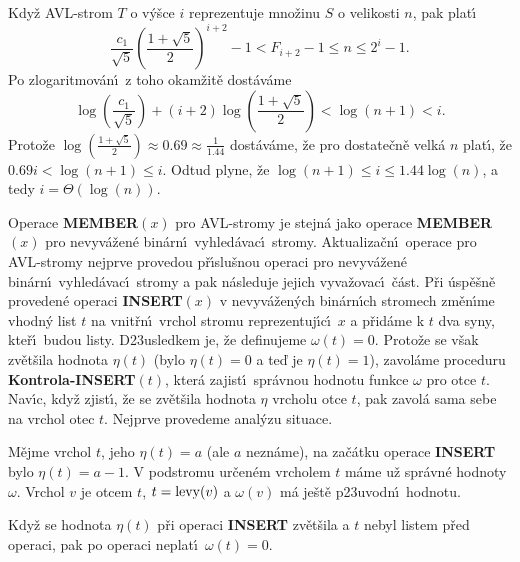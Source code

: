 \flushpar Kdy\v z AVL-strom $T$ o v\'y\v sce $i$ reprezentuje mno\v zinu $
S$ o 
velikosti $n$, pak plat\'\i\ 
$$\frac {c_1}{\sqrt 5}(\frac {1+\sqrt 5}2)^{i+2}-1<F_{i+2}-1\le n
\le 2^i-1.$$
Po zlogaritmov\'an\'\i\ z toho okam\v zit\v e dost\'av\'ame
$$\log(\frac {c_1}{\sqrt 5})+(i+2)\log(\frac {1+\sqrt 5}2)<\log(n
+1)<i.$$
Proto\v ze $\log(\frac {1+\sqrt 5}2)\approx 0.69\approx\frac 1{1.
44}$ dost\'av\'ame, \v ze pro dostate\v cn\v e velk\'a $n$ 
plat\'\i , \v ze $0.69i<\log(n+1)\le i$. Odtud plyne, \v ze 
$\log(n+1)\le i\le 1.44\log(n)$, a tedy $i=\Theta (\log(n))$.
\medskip

\flushpar Operace {\bf MEMBER$(x)$} pro AVL-stromy je stejn\'a jako 
ope\-race {\bf MEMBER$(x)$} pro nevy\-v\'a\-\v zen\'e bin\'arn\'\i\ vyhled\'avac\'\i\ 
stro\-my. Aktualiza\v cn\'\i\ operace pro AVL-stromy nejprve provedou 
p\v r\'\i slu\v snou ope\-raci pro nevyv\'a\v zen\'e bin\'arn\'\i\ vyhled\'avac\'\i\ stromy 
a pak n\'asle\-du\-je jejich vyva\v zovac\'\i\ \v c\'ast. P\v ri \'usp\v e\v sn\v e 
proveden\'e operaci {\bf IN\-SERT$(x)$} v nevyv\'a\v zen\'ych bin\'arn\'\i ch 
stromech zm\v en\'\i me vhod\-n\'y list $t$ na vnit\v rn\'\i\ vrchol 
stromu reprezentuj\'\i c\'\i\ $x$ a p\v rid\'ame k $t$ dva syny, kte\v r\'\i\ 
budou listy. D\accent23usledkem je, \v ze definujeme 
$\omega (t)=0$. Proto\v ze se v\v sak zv\v et\v sila hodnota $\eta 
(t)$ (bylo 
$\eta (t)=0$ a te\v d je $\eta (t)=1$), zavol\'ame proceduru 
{\bf Kontrola-INSERT$(t)$}, kter\'a zajist\'\i\ spr\'avnou hodnotu 
funkce $\omega$ pro otce $t$. Nav\'\i c, kdy\v z zjist\'\i , \v ze se zv\v et\v sila 
hodnota $\eta$ vrcholu otce $t$, pak zavol\'a sama sebe na vrchol 
otec $t$. Nejprve provedeme anal\'yzu situace. 
\medskip

\flushpar M\v ejme vrchol $t$, jeho $\eta (t)=a$ (ale $a$ nezn\'ame), na 
za\v c\'atku 
ope\-ra\-ce {\bf INSERT} bylo $\eta (t)=a-1$.  V podstromu ur\v cen\'em 
vrcholem $t$ m\'ame u\v z spr\'avn\'e hodnoty $\omega$.  Vrchol $
v$ je otcem $t$, 
$t=\operatorname{levy}(v)$ a $\omega (v)$ m\'a je\v st\v e p\accent23uvodn\'\i\ hodnotu.  
\medskip

\proclaim{Lemma}Kdy\v z se hodnota $\eta (t)$ p\v ri operaci {\bf INSERT }
zv\v et\v sila a $t$ nebyl listem p\v red operaci, pak po operaci 
neplat\'\i\ $\omega (t)=0$.
\endproclaim

